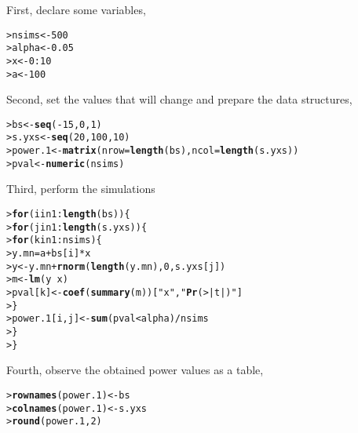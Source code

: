 \documentclass{article}\usepackage{graphicx, color}
\makeatletter
\newcommand{\hlfunctioncall}[1]{\textcolor[rgb]{0.501960784313725,0,0.329411764705882}{\textbf{#1}}}%
\newcommand{\hlstring}[1]{\textcolor[rgb]{0.6,0.6,1}{#1}}%
\newenvironment{kframe}{%
 \def\at@end@of@kframe{}%
 \ifinner\ifhmode%
  \def\at@end@of@kframe{\end{minipage}}%
  \begin{minipage}{\columnwidth}%
 \fi\fi%
 \def\FrameCommand##1{\hskip\@totalleftmargin \hskip-\fboxsep
 \colorbox{shadecolor}{##1}\hskip-\fboxsep
     \hskip-\linewidth \hskip-\@totalleftmargin \hskip\columnwidth}%
 \MakeFramed {\advance\hsize-\width
   \@totalleftmargin\z@ \linewidth\hsize
   \@setminipage}}%
 {\par\unskip\endMakeFramed%
 \at@end@of@kframe}
\newenvironment{knitrout}{}{} %
\makeatother
\begin{document}
First, declare some variables,
\begin{knitrout}
\color{fgcolor}\begin{kframe}
\begin{alltt}
> nsims <- 500
> alpha <- 0.05
> x <- 0:10
> a <- 100
\end{alltt}
\end{kframe}
\end{knitrout}


Second, set the values that will change and prepare the data structures,
\begin{knitrout}
\color{fgcolor}\begin{kframe}
\begin{alltt}
> bs <- \hlfunctioncall{seq}(-15,0,1)
> s.yxs <- \hlfunctioncall{seq}(20,100,10)
> power.1 <- \hlfunctioncall{matrix}(nrow=\hlfunctioncall{length}(bs),ncol=\hlfunctioncall{length}(s.yxs))
> pval <- \hlfunctioncall{numeric}(nsims)
\end{alltt}
\end{kframe}
\end{knitrout}


Third, perform the simulations
\begin{knitrout}
\color{fgcolor}\begin{kframe}
\begin{alltt}
> \hlfunctioncall{for} (i in 1:\hlfunctioncall{length}(bs)) \{
>   \hlfunctioncall{for} (j in 1:\hlfunctioncall{length}(s.yxs)) \{
>     \hlfunctioncall{for} (k in 1:nsims) \{
>       y.mn = a+bs[i]*x
>       y <- y.mn + \hlfunctioncall{rnorm}(\hlfunctioncall{length}(y.mn),0,s.yxs[j])
>       m <- \hlfunctioncall{lm}(y~x)
>       pval[k] <- \hlfunctioncall{coef}(\hlfunctioncall{summary}(m))[\hlstring{"x"}, \hlstring{"\hlfunctioncall{Pr}(>|t|)"}]
>     \}
>     power.1[i,j] <- \hlfunctioncall{sum}(pval < alpha)/nsims
>   \}
> \}
\end{alltt}
\end{kframe}
\end{knitrout}


Fourth, observe the obtained power values as a table,
\begin{knitrout}
\color{fgcolor}\begin{kframe}
\begin{alltt}
> \hlfunctioncall{rownames}(power.1) <- bs
> \hlfunctioncall{colnames}(power.1) <- s.yxs
> \hlfunctioncall{round}(power.1,2)
\end{alltt}
\end{kframe}
\end{knitrout}
\end{document}

